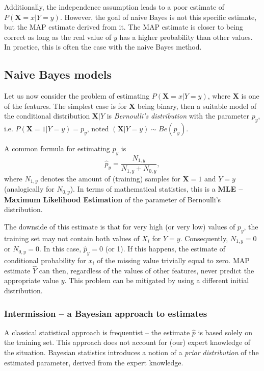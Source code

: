 \documentclass[a4paper]{article}
\begin{document}
	Additionally, the independence assumption leads to a poor estimate of
	$P(\boldsymbol{X} = x | Y = y)$. However, the goal of naive Bayes is not this
	specific estimate, but the MAP estimate derived from it. The MAP estimate
	is closer to being correct as long as the real value of $y$ has a
	higher probability than other values. In practice, this is often the case
	with the naive Bayes method.

	\subsection{Naive Bayes models}
	Let us now consider the problem of estimating $P(\boldsymbol{X} = x | Y = y)$, where
	$\boldsymbol{X}$ is one of the features. The simplest case is for $\boldsymbol{X}$
	being binary, then a suitable model of the conditional distribution
	$\boldsymbol{X}|Y$ is \textit{Bernoulli's distribution} with the parameter $p_y$,
	i.e. $P(\boldsymbol{X} = 1 | Y = y) = p_y$, noted
	$(\boldsymbol{X} | Y = y) \sim Be(p_y)$.

	A common formula for estimating $p_y$ is
	\[
		\hat{p}_y = \frac{N_{1, y}}{N_{1, y} + N_{0, y}}
	,\]
	where $N_{1, y}$ denotes the amount of (training) samples for $\boldsymbol{X} = 1$ 
	and $Y = y$ (analogically for $N_{0, y}$). In terms of mathematical
	statistics, this is a \textbf{MLE -- Maximum Likelihood Estimation} of
	the parameter of Bernoulli's distribution.

	The downside of this estimate is that for very high (or very low) values
	of $p_y$, the training set may not contain both values of $X_i$ for $Y = y$.
	Consequently, $N_{1, y} = 0$ or  $N_{0, y} = 0$. In this case, $\hat{p}_y = 0$
	(or 1). If this happens, the estimate of conditional probability for $x_i$ 
	of the missing value trivially equal to zero. MAP estimate $\hat{Y}$ can then,
	regardless of the values of other features, never predict the appropriate
	value $y$. This problem can be mitigated by using a different initial
	distribution.

	\subsubsection{Intermission -- a Bayesian approach to estimates}
	A classical statistical approach is frequentist -- the estimate $\hat{p}$ 
	is based solely on the training set. This approach does not account
	for (our) expert knowledge of the situation. Bayesian statistics
	introduces a notion of a \textit{prior distribution} of the estimated
	parameter, derived from the expert knowledge.
\end{document}
